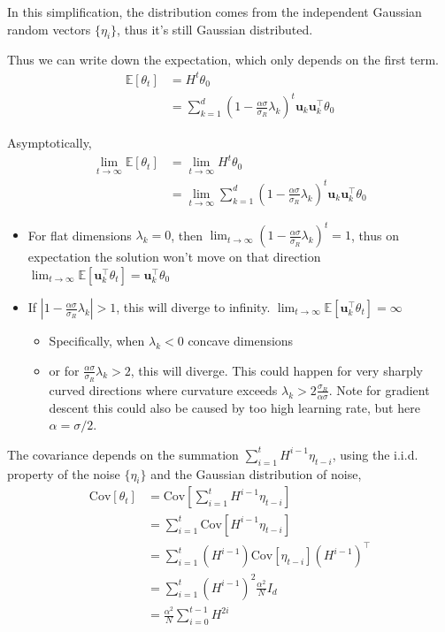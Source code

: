     
    In this simplification, the distribution comes from the independent
    Gaussian random vectors $\{\eta_{i}\}$, thus it's still Gaussian
    distributed. 
    
    Thus we can write down the expectation, which only depends on the
    first term. 
    \begin{align*}
    \mathbb{E}[\theta_{t}] & =H^{t}\theta_{0}\\
     & =\sum_{k=1}^{d}(1-\frac{\alpha\sigma}{\sigma_{R}}\lambda_{k})^{t}\mathbf{u}_{k}\mathbf{u}_{k}^{\top}\theta_{0}
    \end{align*}
    
    Asymptotically, 
    \begin{align*}
    \lim_{t\to\infty}\mathbb{E}[\theta_{t}] & =\lim_{t\to\infty}H^{t}\theta_{0}\\
     & =\lim_{t\to\infty}\sum_{k=1}^{d}(1-\frac{\alpha\sigma}{\sigma_{R}}\lambda_{k})^{t}\mathbf{u}_{k}\mathbf{u}_{k}^{\top}\theta_{0}
    \end{align*}
    
    \begin{itemize}
    \item For flat dimensions $\lambda_{k}=0$, then $\lim_{t\to\infty}(1-\frac{\alpha\sigma}{\sigma_{R}}\lambda_{k})^{t}=1$,
    thus on expectation the solution won't move on that direction $\lim_{t\to\infty}\mathbb{E}[\mathbf{u}_{k}^{\top}\theta_{t}]=\mathbf{u}_{k}^{\top}\theta_{0}$
    \item If $|1-\frac{\alpha\sigma}{\sigma_{R}}\lambda_{k}|>1$, this will
    diverge to infinity. $\lim_{t\to\infty}\mathbb{E}[\mathbf{u}_{k}^{\top}\theta_{t}]=\infty$ 
    \begin{itemize}
    \item Specifically, when $\lambda_{k}<0$ concave dimensions
    \item or for $\frac{\alpha\sigma}{\sigma_{R}}\lambda_{k}>2$, this will
    diverge. This could happen for very sharply curved directions where
    curvature exceeds $\lambda_{k}>2\frac{\sigma_{R}}{\alpha\sigma}$.
    Note for gradient descent this could also be caused by too high learning
    rate, but here $\alpha=\sigma/2$. 
    \end{itemize}
    \end{itemize}
    The covariance depends on the summation $\sum_{i=1}^{t}H^{i-1}\eta_{t-i}$,
    using the i.i.d. property of the noise $\{\eta_{i}\}$ and the Gaussian
    distribution of noise, 
    \begin{align*}
    \mathrm{Cov}[\theta_{t}] & =\mathrm{Cov}[\sum_{i=1}^{t}H^{i-1}\eta_{t-i}]\\
     & =\sum_{i=1}^{t}\mathrm{Cov}[H^{i-1}\eta_{t-i}]\\
     & =\sum_{i=1}^{t}(H^{i-1})\mathrm{Cov}[\eta_{t-i}](H^{i-1})^{\top}\\
     & =\sum_{i=1}^{t}(H^{i-1})^{2}\frac{\alpha^{2}}{N}I_{d}\\
     & =\frac{\alpha^{2}}{N}\sum_{i=0}^{t-1}H^{2i}
    \end{align*}
    
